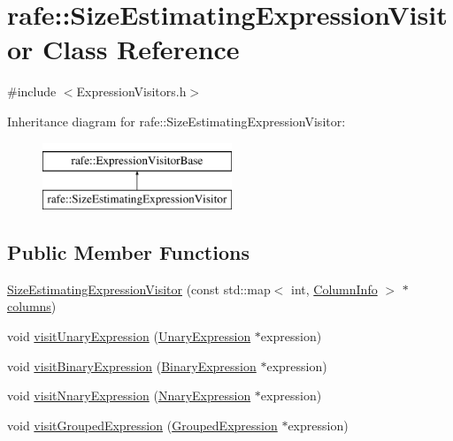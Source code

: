 \hypertarget{classrafe_1_1_size_estimating_expression_visitor}{\section{rafe\+:\+:Size\+Estimating\+Expression\+Visitor Class Reference}
\label{classrafe_1_1_size_estimating_expression_visitor}
}


{\ttfamily \#include $<$Expression\+Visitors.\+h$>$}

Inheritance diagram for rafe\+:\+:Size\+Estimating\+Expression\+Visitor\+:\begin{figure}[H]
\begin{center}
\leavevmode
\includegraphics[height=2.000000cm]{classrafe_1_1_size_estimating_expression_visitor}
\end{center}
\end{figure}
\subsection*{Public Member Functions}
\begin{DoxyCompactItemize}
\item 
\hyperlink{classrafe_1_1_size_estimating_expression_visitor_a90aee8ef9a80a08671e827f0643cf5f5}{Size\+Estimating\+Expression\+Visitor} (const std\+::map$<$ int, \hyperlink{classrafe_1_1_column_info}{Column\+Info} $>$ $\ast$\hyperlink{classrafe_1_1_size_estimating_expression_visitor_ad3b98fc9a1c8b0a90f5ed341c97711cf}{columns})
\item 
void \hyperlink{classrafe_1_1_size_estimating_expression_visitor_aafce8eb508a6b022d4247f14680ba472}{visit\+Unary\+Expression} (\hyperlink{classrafe_1_1_unary_expression}{Unary\+Expression} $\ast$expression)
\item 
void \hyperlink{classrafe_1_1_size_estimating_expression_visitor_ae6dad0b04f4eb3e201a9677124f9577c}{visit\+Binary\+Expression} (\hyperlink{classrafe_1_1_binary_expression}{Binary\+Expression} $\ast$expression)
\item 
void \hyperlink{classrafe_1_1_size_estimating_expression_visitor_a1f1f7587679efcba503a794558980c1a}{visit\+Nnary\+Expression} (\hyperlink{classrafe_1_1_nnary_expression}{Nnary\+Expression} $\ast$expression)
\item 
void \hyperlink{classrafe_1_1_size_estimating_expression_visitor_a56a98bed6c990f2a71ab18ca59ded1eb}{visit\+Grouped\+Expression} (\hyperlink{classrafe_1_1_grouped_expression}{Grouped\+Expression} $\ast$expression)
\end{DoxyCompactItemize}
